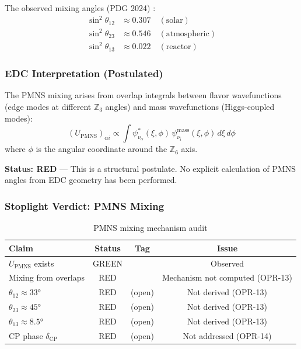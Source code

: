 The observed mixing angles (PDG 2024) \tagBL{}:
\begin{align}
    \sin^2\theta_{12} &\approx 0.307 \quad (\text{solar}) \\
    \sin^2\theta_{23} &\approx 0.546 \quad (\text{atmospheric}) \\
    \sin^2\theta_{13} &\approx 0.022 \quad (\text{reactor})
\end{align}

\subsubsection{EDC Interpretation (Postulated)}

\begin{postulate}
\label{post:ch6_pmns}
The PMNS mixing arises from overlap integrals between flavor wavefunctions
(edge modes at different $\mathbb{Z}_3$ angles) and mass wavefunctions
(Higgs-coupled modes):
\begin{equation}
    (U_{\text{PMNS}})_{\alpha i} \propto \int \psi^*_{\nu_\alpha}(\xi, \phi) \,
    \psi_{\nu_i}^{\text{mass}}(\xi, \phi) \, d\xi \, d\phi
    \label{eq:ch6_pmns_overlap}
\end{equation}
where $\phi$ is the angular coordinate around the $\mathbb{Z}_6$ axis.
\end{postulate}

\textbf{Status: RED} \tagP{} --- This is a structural postulate. No explicit
calculation of PMNS angles from EDC geometry has been performed.

\subsubsection{Stoplight Verdict: PMNS Mixing}

\begin{table}[ht]
\centering
\caption{PMNS mixing mechanism audit}
\label{tab:ch6_pmns_stoplight}
\begin{tabular}{lccc}
\toprule
\textbf{Claim} & \textbf{Status} & \textbf{Tag} & \textbf{Issue} \\
\midrule
$U_{\text{PMNS}}$ exists & GREEN & \tagBL{} & Observed \\
Mixing from overlaps & RED & \tagP{} & Mechanism not computed (OPR-13) \\
$\theta_{12} \approx 33°$ & RED & (open) & Not derived (OPR-13) \\
$\theta_{23} \approx 45°$ & RED & (open) & Not derived (OPR-13) \\
$\theta_{13} \approx 8.5°$ & RED & (open) & Not derived (OPR-13) \\
CP phase $\delta_{\text{CP}}$ & RED & (open) & Not addressed (OPR-14) \\
\bottomrule
\end{tabular}
\end{table}

